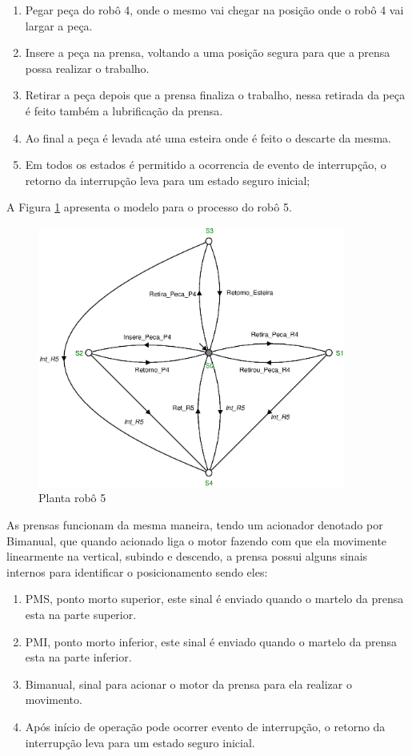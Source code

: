 \begin{enumerate}
  \item Pegar peça do robô 4, onde o mesmo vai chegar na posição onde o robô 4 vai largar a peça.
  \item Insere a peça na prensa, voltando a uma posição segura para que a prensa possa realizar o trabalho.
  \item Retirar a peça depois que a prensa finaliza o trabalho, nessa retirada da peça é feito também a lubrificação da prensa.
  \item Ao final a peça é levada até uma esteira onde é feito o descarte da mesma.
  \item Em todos os estados é permitido a ocorrencia de evento de interrupção, o retorno da interrupção leva para um estado seguro inicial;
\end{enumerate}

A Figura \ref{fig:robo5} apresenta o modelo para o processo do robô 5.

\begin{figure}[H]%
    \centering
    \includegraphics[width=0.9\textwidth]{imagens/robo_5.eps}
    \caption{Planta robô 5}\label{fig:robo5}
\end{figure}

As prensas funcionam da mesma maneira, tendo um acionador denotado por Bimanual, que quando acionado liga o motor fazendo com que ela movimente linearmente na vertical, subindo e descendo, a prensa possui alguns sinais internos para identificar o posicionamento sendo eles:

\begin{enumerate}
  \item PMS, ponto morto superior, este sinal é enviado quando o martelo da prensa esta na parte superior.
  \item PMI, ponto morto inferior, este sinal é enviado quando o martelo da prensa esta na parte inferior.
  \item Bimanual, sinal para acionar o motor da prensa para ela realizar o movimento.
  \item Após início de operação pode ocorrer evento de interrupção, o retorno da interrupção leva para um estado seguro inicial.
\end{enumerate}

